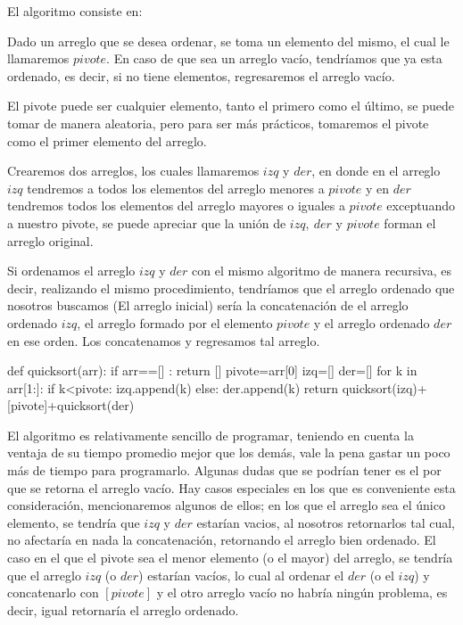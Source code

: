 \documentclass[12pt,a4paper]{article}
\begin{document}
El algoritmo consiste en: 

Dado un arreglo que se desea ordenar, se toma un elemento del mismo, el cual le llamaremos $pivote$. En caso de que sea un arreglo vac\'io, tendr\'iamos que ya esta ordenado, es decir, si no tiene elementos, regresaremos el arreglo vac\'io.

 El pivote puede ser cualquier elemento, tanto el primero como el \'ultimo, se puede tomar de manera aleatoria, pero para ser m\'as pr\'acticos, tomaremos el pivote como el primer elemento del arreglo. 
 
 Crearemos dos arreglos, los cuales llamaremos $izq$ y $der$, en donde en el arreglo $izq$ tendremos a todos los elementos del arreglo menores a $pivote$ y en $der$ tendremos todos los elementos del arreglo mayores o iguales a $pivote$ exceptuando a nuestro pivote, se puede apreciar que la uni\'on de $izq,\>der$ y $pivote$ forman el arreglo original.  
 
 Si ordenamos el arreglo $izq$ y $der$ con el mismo algoritmo de manera recursiva, es decir, realizando el mismo procedimiento, tendr\'iamos que el arreglo ordenado que nosotros buscamos (El arreglo inicial) ser\'ia la concatenaci\'on de el arreglo ordenado $izq$, el arreglo formado por el elemento $pivote$ y el arreglo ordenado $der$ en ese orden. 
Los concatenamos y regresamos tal arreglo.
\newpage
\begin{python}
def quicksort(arr):
    if arr==[] :
        return []
    pivote=arr[0]
    izq=[]
    der=[]
    for k in arr[1:]:
        if k<pivote:
            izq.append(k)
        else:
            der.append(k)
    return quicksort(izq)+[pivote]+quicksort(der)
\end{python}


 El algoritmo es relativamente sencillo de programar, teniendo en cuenta la ventaja de su tiempo promedio mejor que los dem\'as, vale la pena gastar un poco m\'as de tiempo para programarlo. Algunas dudas que se podr\'ian tener es el por que se retorna el arreglo vac\'io. Hay casos especiales en los que es conveniente esta consideraci\'on, mencionaremos algunos de ellos; en los que el arreglo sea el \'unico elemento, se tendr\'ia que $izq$ y $der$ estar\'ian vacios, al nosotros retornarlos tal cual, no afectar\'ia en nada la concatenaci\'on, retornando el arreglo bien ordenado. El caso en el que el pivote sea el menor elemento (o el mayor) del arreglo, se tendr\'ia que el arreglo $izq$ (o $der$) estar\'ian vac\'ios, lo cual al ordenar el $der$ (o el $izq$) y concatenarlo con $[pivote]$ y el otro arreglo vac\'io no habr\'ia ning\'un problema, es decir, igual retornar\'ia el arreglo ordenado.
\newline
\end{document}
